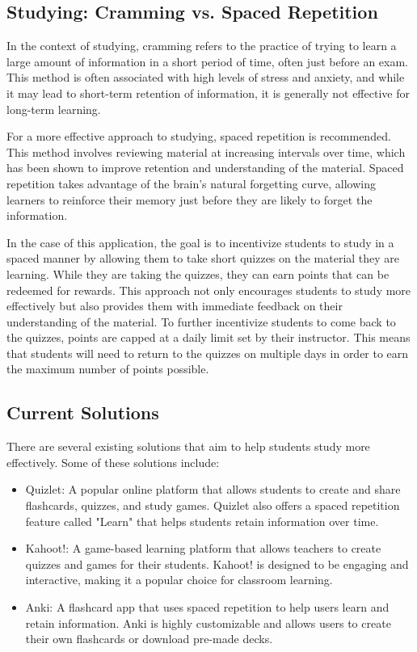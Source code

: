 \subsection{Studying: Cramming vs. Spaced Repetition}
\label{sec:cramming-vs-spaced-repetition}
In the context of studying, cramming refers to the practice of trying to learn a large amount of information in a short period of time, often just before an exam. This method is often associated with high levels of stress and anxiety, and while it may lead to short-term retention of information, it is generally not effective for long-term learning.

For a more effective approach to studying, spaced repetition is recommended. This method involves reviewing material at increasing intervals over time, which has been shown to improve retention and understanding of the material. Spaced repetition takes advantage of the brain's natural forgetting curve, allowing learners to reinforce their memory just before they are likely to forget the information.\cite{cepeda2006distributed}

In the case of this application, the goal is to incentivize students to study in a spaced manner by allowing them to take short quizzes on the material they are learning. While they are taking the quizzes, they can earn points that can be redeemed for rewards.\cite{liu2022immediate} This approach not only encourages students to study more effectively but also provides them with immediate feedback on their understanding of the material.\cite{staddon2003operant} To further incentivize students to come back to the quizzes, points are capped at a daily limit set by their instructor. This means that students will need to return to the quizzes on multiple days in order to earn the maximum number of points possible.

\subsection{Current Solutions}
\label{sec:current-solutions}

There are several existing solutions that aim to help students study more effectively. Some of these solutions include:

\begin{itemize}
  \item Quizlet: A popular online platform that allows students to create and share flashcards, quizzes, and study games. Quizlet also offers a spaced repetition feature called "Learn" that helps students retain information over time.
  \item Kahoot!: A game-based learning platform that allows teachers to create quizzes and games for their students. Kahoot! is designed to be engaging and interactive, making it a popular choice for classroom learning.
  \item Anki: A flashcard app that uses spaced repetition to help users learn and retain information. Anki is highly customizable and allows users to create their own flashcards or download pre-made decks.
\end{itemize}

